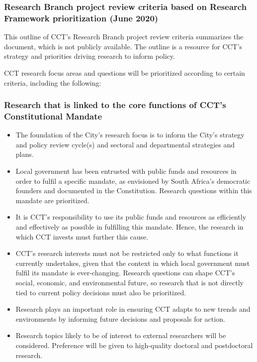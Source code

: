 \hypertarget{research-branch-project-review-criteria-based-on-research-framework-prioritization-june-2020}{%
\subsubsection*{Research Branch project review criteria based on Research Framework prioritization (June 2020)}\label{research-branch-project-review-criteria-based-on-research-framework-prioritization-june-2020}}

This outline of CCT's Research Branch project review criteria summarizes the document, which is not publicly available. The outline is a resource for CCT's strategy and priorities driving research to inform policy.

CCT research focus areas and questions will be prioritized according to certain criteria, including the following:

\hypertarget{research-that-is-linked-to-the-core-functions-of-ccts-constitutional-mandate}{%
\subsubsection*{Research that is linked to the core functions of CCT's Constitutional Mandate}\label{research-that-is-linked-to-the-core-functions-of-ccts-constitutional-mandate}}

\begin{itemize}
\tightlist
\item
  The foundation of the City's research focus is to inform the City's strategy and policy review cycle(s) and sectoral and departmental strategies and plans.
\item
  Local government has been entrusted with public funds and resources in order to fulfil a specific mandate, as envisioned by South Africa's democratic founders and documented in the Constitution. Research questions within this mandate are prioritized.
\item
  It is CCT's responsibility to use its public funds and resources as efficiently and effectively as possible in fulfilling this mandate. Hence, the research in which CCT invests must further this cause.
\item
  CCT's research interests must not be restricted only to what functions it currently undertakes, given that the context in which local government must fulfil its mandate is ever-changing. Research questions can shape CCT's social, economic, and environmental future, so research that is not directly tied to current policy decisions must also be prioritized.
\item
  Research plays an important role in ensuring CCT adapts to new trends and environments by informing future decisions and proposals for action.
\item
  Research topics likely to be of interest to external researchers will be considered. Preference will be given to high-quality doctoral and postdoctoral research.
\end{itemize}

